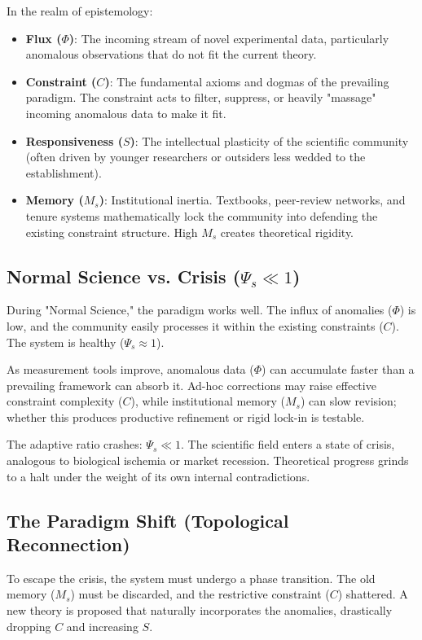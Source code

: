 \documentclass[11pt,a4paper]{article}
\begin{document}
In the realm of epistemology:
\begin{itemize}
    \item \textbf{Flux ($\Phi$)}: The incoming stream of novel experimental data, particularly anomalous observations that do not fit the current theory.
    \item \textbf{Constraint ($C$)}: The fundamental axioms and dogmas of the prevailing paradigm. The constraint acts to filter, suppress, or heavily "massage" incoming anomalous data to make it fit.
    \item \textbf{Responsiveness ($S$)}: The intellectual plasticity of the scientific community (often driven by younger researchers or outsiders less wedded to the establishment).
    \item \textbf{Memory ($M_s$)}: Institutional inertia. Textbooks, peer-review networks, and tenure systems mathematically lock the community into defending the existing constraint structure. High $M_s$ creates theoretical rigidity.
\end{itemize}

\subsection{Normal Science vs. Crisis ($\Psi_s \ll 1$)}
During "Normal Science," the paradigm works well. The influx of anomalies ($\Phi$) is low, and the community easily processes it within the existing constraints ($C$). The system is healthy ($\Psi_s \approx 1$).

As measurement tools improve, anomalous data ($\Phi$) can accumulate faster than a prevailing framework can absorb it. Ad-hoc corrections may raise effective constraint complexity ($C$), while institutional memory ($M_s$) can slow revision; whether this produces productive refinement or rigid lock-in is testable.

The adaptive ratio crashes: $\Psi_s \ll 1$. The scientific field enters a state of crisis, analogous to biological ischemia or market recession. Theoretical progress grinds to a halt under the weight of its own internal contradictions.

\subsection{The Paradigm Shift (Topological Reconnection)}
To escape the crisis, the system must undergo a phase transition. The old memory ($M_s$) must be discarded, and the restrictive constraint ($C$) shattered. A new theory is proposed that naturally incorporates the anomalies, drastically dropping $C$ and increasing $S$.
\end{document}
